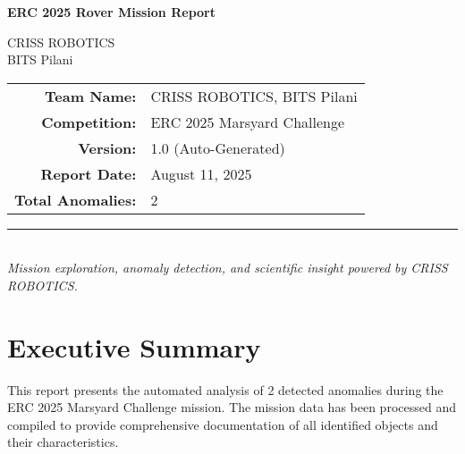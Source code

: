 \documentclass[12pt,a4paper]{report}
\newcommand\BackgroundPic{
    \put(0,0){
    \parbox[b][\paperheight]{\paperwidth}{
      \vfill
      \centering
      \transparent{0.06}
      \resizebox{0.95\textwidth}{!}{
      \scalebox{2.1}{\Huge\sf CRISS ROBOTICS -- BITS Pilani}
      }
      \vfill
    }
  }
}
\begin{document}
\AddToShipoutPicture*{\BackgroundPic}


\begin{titlepage}
    \centering
    {\Huge \bfseries ERC 2025 Rover Mission Report\par}
    \vspace{2cm}
    \vspace{1.5cm}
    {\Large CRISS ROBOTICS\\BITS Pilani}\\[0.8cm]

    \begin{tabular}{rl}
            \textbf{Team Name:} & CRISS ROBOTICS, BITS Pilani \\
            \textbf{Competition:} & ERC 2025 Marsyard Challenge \\
            \textbf{Version:} & 1.0 (Auto-Generated) \\
            \textbf{Report Date:} & August 11, 2025 \\
            \textbf{Total Anomalies:} & 2 \\
    \end{tabular}

    \vfill
    \rule{0.8\textwidth}{0.8pt} \\
    \vspace{0.5cm}
    \itshape
    Mission exploration, anomaly detection, and scientific insight powered by CRISS ROBOTICS.
\end{titlepage}

\clearpage

{
    \hypersetup{linkcolor=black}
    \tableofcontents
    \thispagestyle{empty}
    \clearpage
}


\chapter{Executive Summary}
This report presents the automated analysis of 2 detected anomalies during the ERC 2025 Marsyard Challenge mission. The mission data has been processed and compiled to provide comprehensive documentation of all identified objects and their characteristics.
\end{document}
